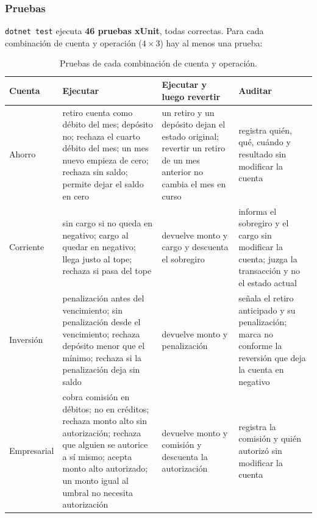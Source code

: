 \subsubsection{Pruebas}

\texttt{dotnet test} ejecuta \textbf{46 pruebas xUnit}, todas correctas. Para cada
combinación de cuenta y operación ($4 \times 3$) hay al menos una prueba:

\begin{table}[H]
\centering
\footnotesize
\begin{tabularx}{\textwidth}{>{\raggedright\arraybackslash}p{1.9cm}
                             >{\raggedright\arraybackslash}X
                             >{\raggedright\arraybackslash}X
                             >{\raggedright\arraybackslash}X}
\toprule
\textbf{Cuenta} & \textbf{Ejecutar} & \textbf{Ejecutar y luego revertir} & \textbf{Auditar} \\
\midrule
Ahorro & retiro cuenta como débito del mes; depósito no; rechaza el cuarto débito del mes; un
         mes nuevo empieza de cero; rechaza sin saldo; permite dejar el saldo en cero
       & un retiro y un depósito dejan el estado original; revertir un retiro de un mes
         anterior no cambia el mes en curso
       & registra quién, qué, cuándo y resultado sin modificar la cuenta \\
\addlinespace
Corriente & sin cargo si no queda en negativo; cargo al quedar en negativo; llega justo al
            tope; rechaza si pasa del tope
          & devuelve monto y cargo y descuenta el sobregiro
          & informa el sobregiro y el cargo sin modificar la cuenta; juzga la transacción y no
            el estado actual \\
\addlinespace
Inversión & penalización antes del vencimiento; sin penalización desde el vencimiento;
            rechaza depósito menor que el mínimo; rechaza si la penalización deja sin saldo
          & devuelve monto y penalización
          & señala el retiro anticipado y su penalización; marca no conforme la reversión que
            deja la cuenta en negativo \\
\addlinespace
Empresarial & cobra comisión en débitos; no en créditos; rechaza monto alto sin autorización;
              rechaza que alguien se autorice a sí mismo; acepta monto alto autorizado; un
              monto igual al umbral no necesita autorización
            & devuelve monto y comisión y descuenta la autorización
            & registra la comisión y quién autorizó sin modificar la cuenta \\
\bottomrule
\end{tabularx}
\caption{Pruebas de cada combinación de cuenta y operación.}
\end{table}

